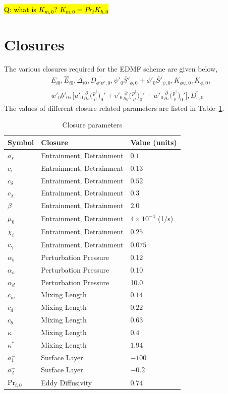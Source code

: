 \documentclass{report}
\begin{document}
\hl{Q: what is $K_{m,0}$? $K_{m,0} = Pr_{t}K_{h, 0}$}





\section{Closures} \label{sec:Closures}
The various closures required for the EDMF scheme are given below,
\begin{align*}
E_{i0}, \hat{E}_{i0}, \Delta_{i0},  \overline{D_{\phi' \psi', 0}},   \overline{\psi'_0 S'_{\phi,0}} + \overline{\phi'_0 S'_{\psi,0}} ,  K_{\phi\psi,0}, K_{\phi,0} ,\\ 
\overline{w'_0 b'_0}, 
\Bigg[\overline{u'_0\frac{\partial }{\partial x}\Bigg( \frac{p^\dagger}{\rho}\Bigg)_0'} + \overline{v'_0\frac{\partial}{\partial y} \Bigg( \frac{p^\dagger}{\rho}\Bigg)_0'}+ \overline{w'_0\frac{\partial}{\partial z} \Bigg( \frac{p^\dagger}{\rho}\Bigg)_0'}  \Bigg] ,   \overline{D_{e, 0}}
\end{align*}
The values of different closure related parameters are listed in Table~\ref{table:parameters}.

\begin{table}[htbp]
\caption{Closure parameters}
\label{table:parameters}
\centering
\begin{tabular}{lll}
\hline 
Symbol & Closure & Value (units)\\
\hline 
$a_{s}$ & Entrainment, Detrainment &   $0.1$ \\
$c_{\epsilon}$ & Entrainment, Detrainment &  $0.13$ \\
$c_{\delta}$ & Entrainment, Detrainment &  $0.52$ \\
$c_{\lambda}$ & Entrainment, Detrainment &  $0.3$ \\
$\beta$ & Entrainment, Detrainment &  $2.0$\\
$\mu_0$ & Entrainment, Detrainment &  $ 4 \times 10^{-4}$  (1/s) \\
$\chi_{i}$ & Entrainment, Detrainment & $ 0.25 $\\
$c_{\gamma}$ & Entrainment, Detrainment & $ 0.075 $\\
$\alpha_b$ & Perturbation Pressure &  0.12 \\
$\alpha_a$ & Perturbation Pressure & 0.10 \\
$\alpha_d$ & Perturbation Pressure & 10.0 \\
$c_m$ & Mixing Length & $0.14$ \\
$c_{d}$ & Mixing Length &  $0.22$ \\
$c_{b}$ & Mixing Length &  $0.63$ \\
$\kappa$ & Mixing Length &  $0.4$ \\
$\kappa^*$ & Mixing Length & $1.94$ \\
$a_1^-$ & Surface Layer & $-100$ \\
$a_2^-$ & Surface Layer & $-0.2$\\
$\mathrm{Pr}_{t,0}$ & Eddy Diffusivity & $0.74$\\
\hline 
\end{tabular}
\end{table}
\end{document}
